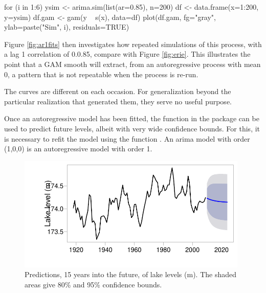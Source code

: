 \begin{marginfigure}[-1.5cm]
\begin{Schunk}
\begin{Sinput}
for (i in 1:6){
ysim <-
  arima.sim(list(ar=0.85),
            n=200)
df <- data.frame(x=1:200,
                 y=ysim)
df.gam <- gam(y ~ s(x),
              data=df)
plot(df.gam, fg="gray",
     ylab=paste("Sim", i),
     residuals=TRUE)
}
\end{Sinput}
\end{Schunk}
\end{marginfigure}

Figure \ref{fig:ar1fits} then investigates how repeated simulations of
this process, with a lag 1 correlation of 0.0.85, compare with Figure
\ref{fig:erie}.  This illustrates the point that a GAM smooth will
extract, from an autoregressive process with mean 0, a pattern that is
not repeatable when the process is re-run.

The curves are different on each occasion.  For generalization beyond
the particular realization that generated them, they serve no useful
purpose.

Once an autoregressive model has been fitted, the function
 in the  package can be used to
predict future levels, albeit with very wide confidence bounds.
For this, it is necessary to refit the model using the function
. An arima model with order (1,0,0) is an autoregressive
model with order 1.
\vspace*{10pt}

\begin{figure}
\begin{Schunk}


\centerline{\includegraphics[width=0.98\textwidth]{figs/9-Erie-fcast-1} }

\end{Schunk}
\caption{Predictions, 15 years into the future, of lake levels
  (m). The shaded areas give 80\% and 95\% confidence bounds.
}\label{Erie-fcastplot}
\end{figure}

